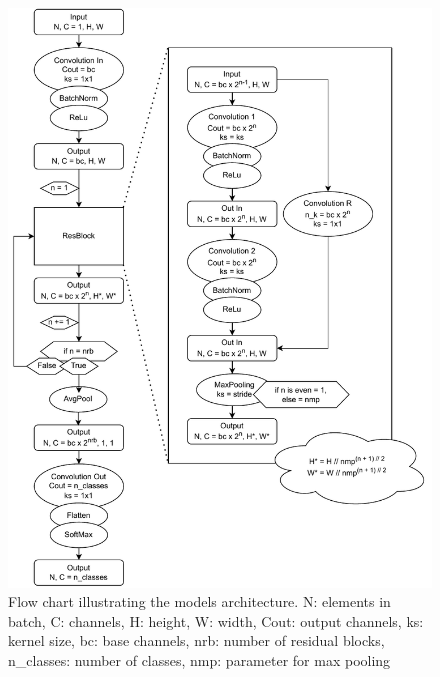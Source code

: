 \begin{figure}[H]
    \centering
    \captionsetup{width=.9\linewidth}
    \includegraphics[width=1\textwidth]{figures/model_flow_chart.pdf}
    \caption{
        Flow chart illustrating the models architecture. N: elements in batch, C: channels, H: height, W: width,
        Cout: output channels, ks: kernel size, bc: base channels, nrb: number of residual blocks,
        n\_classes: number of classes, nmp: parameter for max pooling
        }
    \label{fig:model_flow_chart}
\end{figure}